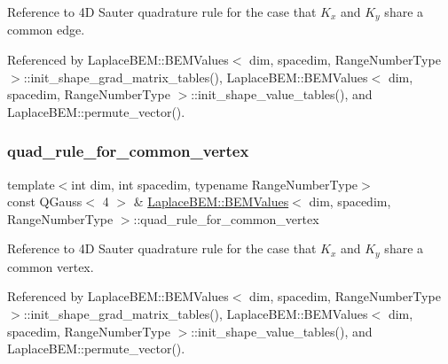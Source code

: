 Reference to 4D Sauter quadrature rule for the case that $K_x$ and $K_y$ share a common edge. 

Referenced by Laplace\+B\+E\+M\+::\+B\+E\+M\+Values$<$ dim, spacedim, Range\+Number\+Type $>$\+::init\+\_\+shape\+\_\+grad\+\_\+matrix\+\_\+tables(), Laplace\+B\+E\+M\+::\+B\+E\+M\+Values$<$ dim, spacedim, Range\+Number\+Type $>$\+::init\+\_\+shape\+\_\+value\+\_\+tables(), and Laplace\+B\+E\+M\+::permute\+\_\+vector().

\mbox{\label{classLaplaceBEM_1_1BEMValues_a2b964d73a6d9bd80fe1ef419e1cebd4f}} 
\subsubsection{\texorpdfstring{quad\+\_\+rule\+\_\+for\+\_\+common\+\_\+vertex}{quad\_rule\_for\_common\_vertex}}
{\footnotesize\ttfamily template$<$int dim, int spacedim, typename Range\+Number\+Type$>$ \\
const Q\+Gauss$<$ 4 $>$ \& \hyperlink{classLaplaceBEM_1_1BEMValues}{Laplace\+B\+E\+M\+::\+B\+E\+M\+Values}$<$ dim, spacedim, Range\+Number\+Type $>$\+::quad\+\_\+rule\+\_\+for\+\_\+common\+\_\+vertex}

Reference to 4D Sauter quadrature rule for the case that $K_x$ and $K_y$ share a common vertex. 

Referenced by Laplace\+B\+E\+M\+::\+B\+E\+M\+Values$<$ dim, spacedim, Range\+Number\+Type $>$\+::init\+\_\+shape\+\_\+grad\+\_\+matrix\+\_\+tables(), Laplace\+B\+E\+M\+::\+B\+E\+M\+Values$<$ dim, spacedim, Range\+Number\+Type $>$\+::init\+\_\+shape\+\_\+value\+\_\+tables(), and Laplace\+B\+E\+M\+::permute\+\_\+vector().

\mbox{\label{classLaplaceBEM_1_1BEMValues_a65083f9822aa923512c775d0d9986939}} 
